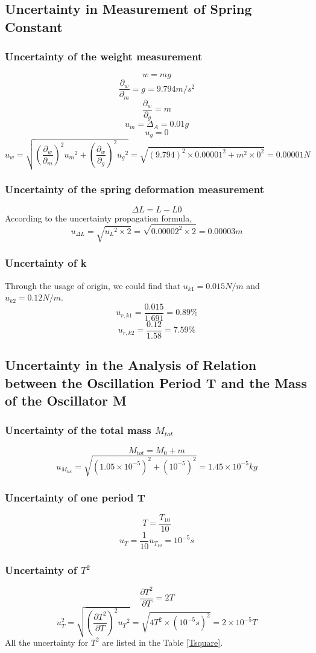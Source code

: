 \documentclass[12pt,a4paper]{article}
\begin{document}
\subsection{Uncertainty in Measurement of Spring Constant}
\subsubsection{Uncertainty of the weight measurement}
$$w=mg$$
$$\frac{\partial_w}{\partial_m}=g=9.794m/s^2$$
$$\frac{\partial_w}{\partial_g}=m$$
$$u_m=\Delta_A=0.01g$$
$$u_g=0$$
$$u_w=\sqrt{(\frac{\partial_w}{\partial_m})^2{u_m}^2+(\frac{\partial_w}{\partial_g})^2{u_g}^2}=\sqrt{(9.794)^2\times0.00001^2+m^2 \times 0^2}=0.00001N$$
\subsubsection{Uncertainty of the spring deformation measurement}
$$\Delta L=L-L0$$
According to the uncertainty propagation formula,
$$u_{\Delta L}=\sqrt{{u_L}^2\times 2}=\sqrt{0.00002^2\times 2}=0.00003m$$
\subsubsection{Uncertainty of k}
Through the usage of origin, we could find that $u_{k1}=0.015N/m$ and $u_{k2}=0.12N/m$.
$$u_{r,k1}=\frac{0.015}{1.691}=0.89\%$$ 
$$u_{r,k2}=\frac{0.12}{1.58}=7.59\%$$ 

\subsection{Uncertainty in the Analysis of Relation between the Oscillation Period T and the Mass of the Oscillator M}

\subsubsection{Uncertainty of the total mass $M_{tot}$}
$$M_{tot}=M_0+m$$
$$u_{M_{tot}}=\sqrt{(1.05\times 10^{-5})^2+(10^{-5})^2}=1.45\times 10^{-5}kg$$

\subsubsection{Uncertainty of one period T}
$$T=\frac{T_{10}}{10}$$
$$u_T=\frac{1}{10}u_{T_{10}}=10^{-5}s$$

\subsubsection{Uncertainty of $T^2$}
$$\frac{\partial T^2}{\partial T}=2T$$
$$u_T^2=\sqrt{(\frac{\partial T^2}{\partial T})^2{u_T}^2}=\sqrt{4T^2\times (10^{-5}s)^2}=2\times 10^{-5}T$$
All the uncertainty for $T^2$ are listed in the Table \ref{Tsquare}.
\end{document}
